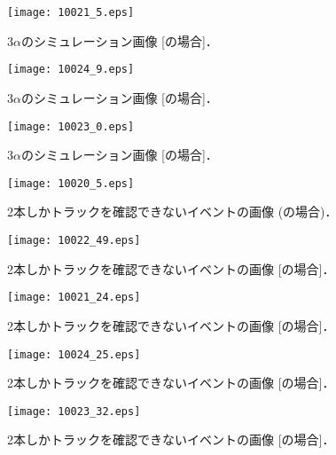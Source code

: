 \documentclass[../master]{subfiles}
\begin{document}
\begin{figure}
  \centering
  \texttt{[image: 10021\_5.eps]}
  \caption{3$\alpha$のシミュレーション画像 [\MethaneHerium の場合]．}
  \label{fig::three_alpha_ch4_he}
\end{figure}

\begin{figure}
  \centering
  \texttt{[image: 10024\_9.eps]}
  \caption{3$\alpha$のシミュレーション画像 [\isoButaneHydro の場合]．}
  \label{fig::three_alpha_ic4h10_h2}
\end{figure}

\begin{figure}
  \centering
  \texttt{[image: 10023\_0.eps]}
  \caption{3$\alpha$のシミュレーション画像 [\isoButaneHerium の場合]．}
  \label{fig::three_alpha_ic4h10_he}
\end{figure}
\begin{figure}
  \centering
  \texttt{[image: 10020\_5.eps]}
  \caption{2本しかトラックを確認できないイベントの画像 (\Methane の場合)．}
  \label{fig::not_three_alpha_ch4}
\end{figure}
\begin{figure}
  \centering
  \texttt{[image: 10022\_49.eps]}
  \caption{2本しかトラックを確認できないイベントの画像 [\MethaneHydro の場合]．}
  \label{fig::not_three_alpha_ch4_h2}
\end{figure}
\begin{figure}
  \centering
  \texttt{[image: 10021\_24.eps]}
  \caption{2本しかトラックを確認できないイベントの画像 [\MethaneHerium の場合]．}
  \label{fig::not_three_alpha_ch4_he}
\end{figure}
\begin{figure}
  \centering
  \texttt{[image: 10024\_25.eps]}
  \caption{2本しかトラックを確認できないイベントの画像 [\isoButaneHydro の場合]．}
  \label{fig::not_three_alpha_ic4h10_h2}
\end{figure}
\begin{figure}
  \centering
  \texttt{[image: 10023\_32.eps]}
  \caption{2本しかトラックを確認できないイベントの画像 [\isoButaneHerium の場合]．}
  \label{fig::not_three_alpha_ic4h10_he}
\end{figure}
\end{document}
